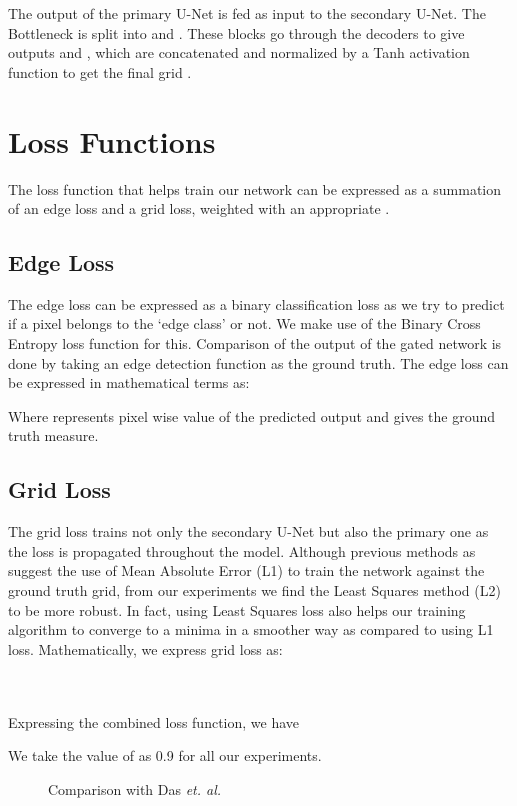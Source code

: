 \documentclass[a4paper,conference]{IEEEtran}
\begin{document}
	The output of the primary U-Net  is fed as input to the secondary U-Net. The Bottleneck  is split into  and . These blocks go through the decoders to give outputs  and , which are concatenated and normalized by a Tanh activation function to get the final grid .
	
	
	\section{Loss Functions}
	
	The loss function that helps train our network can be expressed as a summation of an edge loss and a grid loss, weighted with an appropriate .
	
	\subsection{Edge Loss}
	The edge loss can be expressed as a binary classification loss as we try to predict if a pixel belongs to the `edge class' or not. We make use of the Binary Cross Entropy loss function for this. Comparison of the output of the gated network is done by taking an edge detection function as the ground truth. The edge loss can be expressed in mathematical terms as:
	
	Where  represents pixel wise value of the predicted output and  gives the ground truth measure.
	\subsection{Grid Loss}
	The grid loss trains not only the secondary U-Net but also the primary one as the loss is propagated throughout the model. Although previous methods as \cite{Ma-CVPR18} suggest the use of Mean Absolute Error (L1) to train the network against the ground truth grid, from our experiments we find the Least Squares method (L2) to be more robust. In fact, using Least Squares loss also helps our training algorithm to converge to a minima in a smoother way as compared to using L1 loss.
	Mathematically, we express grid loss as:
	
	\\
	\\
	Expressing the combined loss function, we have
	
	
	We take the value of  as 0.9 for all our experiments.
	
	\begin{figure}
		\centering
		
		\caption{Comparison with Das \textit{et. al.}\cite{das2017common}}
	\end{figure}
	
\end{document}
